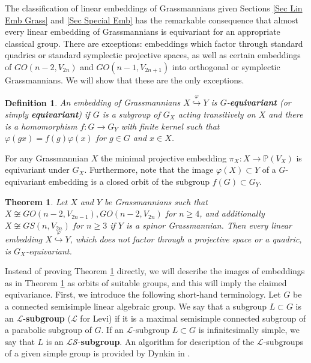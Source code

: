 \documentclass[12pt]{amsart}
\def\PP {{\mathbb P}}     %
\def\hw  {\hookrightarrow}
\def\mc {\mathcal}
\newtheorem{theorem}{Theorem}[section]
\newtheorem{definition}{Definition}[section]
\begin{document}
The classification of linear embeddings of Grassmannians given Sections \ref{Sec Lin Emb Grass} and \ref{Sec Special Emb} has the remarkable consequence that almost every linear embedding of Grassmannians is equivariant for an appropriate classical group. There are exceptions: embeddings which factor through standard quadrics or standard symplectic projective spaces, as well as certain embeddings of $GO(n-2,V_{2n})$ and $GO(n-1,V_{2n+1})$ into orthogonal or symplectic Grassmannians. We will show that these are the only exceptions.


\begin{definition}\label{Def Equivar}
An embedding of Grassmannians $X\stackrel{\varphi}{\hookrightarrow} Y$ is $G$-{\bf equivariant} (or simply {\bf equivariant}) if $G$ is a subgroup of $G_X$ acting transitively on $X$ and there is a homomorphism $f:G\to G_Y$ with finite kernel such that $\varphi(gx)=f(g)\varphi(x)$ for $g\in G$ and $x\in X$.
\end{definition}

For any Grassmannian $X$ the minimal projective embedding $\pi_X:X\to\PP(V_X)$ is equivariant under $G_X$. Furthermore, note that the image $\varphi(X)\subset Y$ of a $G$-equivariant embedding is a closed orbit of the subgroup $f(G)\subset G_Y$.


\begin{theorem}\label{Theo Equivar gen}
Let $X$ and $Y$ be Grassmannians such that $X \not\cong GO(n-2,V_{2n-1}),GO(n-2,V_{2n})$ for $n\geq 4$, and additionally $X\not\cong GS(n,V_{2n})$ for $n\geq3$ if $Y$ is a spinor Grassmannian. Then every linear embedding $X\stackrel{\varphi}{\hw} Y$, which does not factor through a projective space or a quadric, is $G_X$-equivariant.
\end{theorem}

Instead of proving Theorem \ref{Theo Equivar gen} directly, we will describe the images of embeddings as in Theorem \ref{Theo Equivar gen} as orbits of suitable groups, and this will imply the claimed equivariance. First, we introduce the following short-hand terminology. Let $G$ be a connected semisimple linear algebraic group. We say that a subgroup $L\subset G$ is an $\mc L$-{\bf subgroup} ($\mc L$ for Levi) if it is a maximal semisimple connected subgroup of a parabolic subgroup of $G$. If an $\mc L$-subgroup $L\subset G$ is infinitesimally simple, we say that $L$ is an $\mc{LS}$-{\bf subgroup}. An algorithm for description of the $\mc{L}$-subgroups of a given simple group is provided by Dynkin in \cite{Dynkin-1952}.
\end{document}
